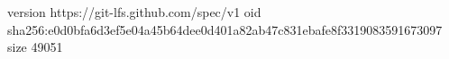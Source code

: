 version https://git-lfs.github.com/spec/v1
oid sha256:e0d0bfa6d3ef5e04a45b64dee0d401a82ab47c831ebafe8f3319083591673097
size 49051
